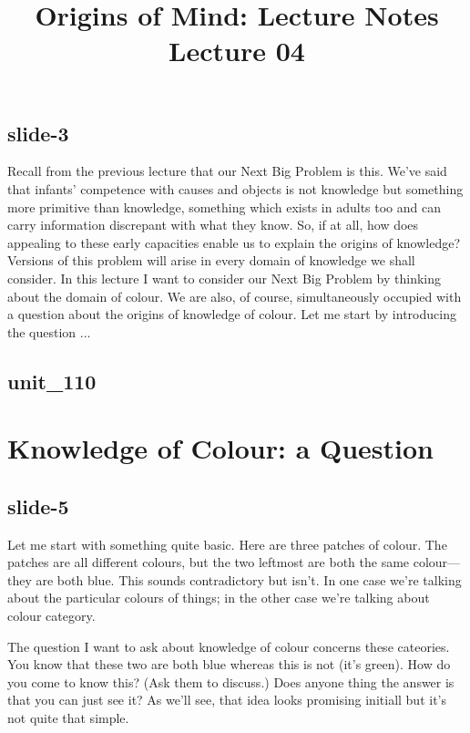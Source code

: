 \documentclass[12pt,\papersize]{extarticle}
\begin{document}
\setlength\footnotesep{1em}








\title {Origins of Mind: Lecture Notes \\ Lecture 04}
 
\maketitle
 
 
\subsection{slide-3}
Recall from the previous lecture that our Next Big Problem is this. We've said that infants' competence with causes and objects is not knowledge but something more primitive than knowledge, something which exists in adults too and can carry information discrepant with what they know. So, if at all, how does appealing to these early capacities enable us to explain the origins of knowledge?
Versions of this problem will arise in every domain of knowledge we shall consider. In this lecture I want to consider our Next Big Problem by thinking about the domain of colour. We are also, of course, simultaneously occupied with a question about the origins of knowledge of colour. Let me start by introducing the question ...
 
 
\subsection{unit\_110}
 
\section{Knowledge of Colour: a Question}
 
 
\subsection{slide-5}
Let me start with something quite basic.
Here are three patches of colour.
The patches are all different colours, but the two leftmost are both the same colour---they are both blue.
This sounds contradictory but isn't.
In one case we're talking about the particular colours of things; in the other case we're talking about colour category.
 
The question I want to ask about knowledge of colour concerns these cateories.
You know that these two are both blue whereas this is not (it's green).
How do you come to know this?
(Ask them to discuss.)
Does anyone thing the answer is that you can just see it? As we'll see, that idea looks promising initiall but it's not quite that simple.
 
\end{document}
